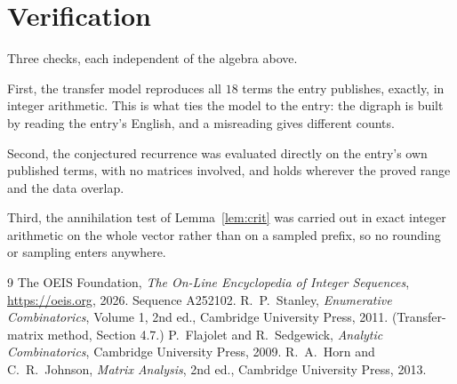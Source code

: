 \documentclass[11pt,a4paper]{article}
\theoremstyle{plain}
\theoremstyle{definition}
\begin{document}
\section{Verification}

Three checks, each independent of the algebra above.

First, the transfer model reproduces all $18$ terms the entry publishes, exactly, in
integer arithmetic. This is what ties the model to the entry: the digraph is built by reading
the entry's English, and a misreading gives different counts.

Second, the conjectured recurrence was evaluated directly on the entry's own published terms,
with no matrices involved, and holds wherever the proved range and the data overlap.

Third, the annihilation test of Lemma~\ref{lem:crit} was carried out in exact integer
arithmetic on the whole vector rather than on a sampled prefix, so no rounding or sampling
enters anywhere.

\begin{thebibliography}{9}
 The OEIS Foundation, \emph{The On-Line Encyclopedia of Integer
Sequences}, \url{https://oeis.org}, 2026. Sequence A252102.
 R.~P.~Stanley, \emph{Enumerative Combinatorics}, Volume 1, 2nd ed.,
Cambridge University Press, 2011. (Transfer-matrix method, Section 4.7.)
 P.~Flajolet and R.~Sedgewick, \emph{Analytic Combinatorics}, Cambridge
University Press, 2009.
 R.~A.~Horn and C.~R.~Johnson, \emph{Matrix Analysis}, 2nd ed., Cambridge
University Press, 2013.
\end{thebibliography}
\end{document}
